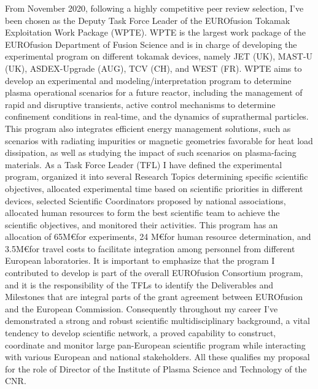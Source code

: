 From November 2020,  following a highly competitive peer review
selection, I've been 
chosen as the Deputy Task Force Leader of the EUROfusion Tokamak
Exploitation Work Package (WPTE). WPTE is the largest work package of
the EUROfusion Department
of Fusion Science and is in charge of developing the experimental
program on different tokamak devices, namely JET (UK), MAST-U (UK),
ASDEX-Upgrade (AUG), TCV (CH), and WEST (FR).
WPTE aims to develop an experimental and modeling/interpretation
program to determine plasma operational scenarios for a future
reactor, including the
management of rapid and disruptive transients, active control
mechanisms to
determine confinement conditions in real-time, and the dynamics of
suprathermal particles.
This program also integrates efficient energy management solutions,
such as scenarios with
radiating impurities or magnetic geometries favorable for heat load
dissipation, as well as studying the impact of such scenarios on
plasma-facing materials.
As a Task Force Leader (TFL) I have defined the experimental program,
organized it into several Research Topics
determining specific scientific objectives, allocated
experimental time based on
scientific priorities in different devices, selected Scientific
Coordinators proposed by
national associations, allocated human resources to form the best
scientific team
to achieve the scientific objectives, and monitored their
activities. This program
has an allocation of 65M\euro for experiments, 24 M\euro for human
resource determination,
and 3.5M\euro for travel costs to facilitate integration among
personnel from different European laboratories.
It is important to emphasize that the program I contributed to develop is part
of the overall
EUROfusion Consortium program, and it is the responsibility of the
TFLs to
identify the Deliverables and Milestones that are integral parts of
the grant agreement between
EUROfusion and the European Commission.
Consequently throughout my career I've demonstrated a strong and
robust scientific multidisciplinary background, a vital tendency to develop scientific 
network, a proved capability to construct, coordinate and monitor
large pan-European scientific program while interacting with various European and national
stakeholders. All these qualifies my proposal for the role of Director
of the Institute of Plasma Science and Technology of the CNR. 


